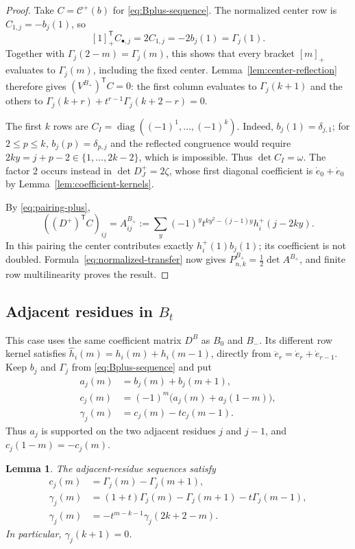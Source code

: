 \documentclass[12pt]{article}
\newtheorem{lemma}[theorem]{Lemma}
\numberwithin{equation}{section}
\newcommand{\dote}{\dot e}
\newcommand{\ddote}{\ddot e}
\newcommand{\diag}{\operatorname{diag}}
\begin{document}
\begin{proof}
Take $C=\mathcal C^+(b)$ for \eqref{eq:Bplus-sequence}.
The normalized center row is $C_{1,j}=-b_j(1)$, so
\[
 [1]_+^{\mathsf T}C_{\bullet,j}=2C_{1,j}
 =-2b_j(1)=\Gamma_j(1).
\]
Together with $\Gamma_j(2-m)=\Gamma_j(m)$, this shows that every
bracket $[m]_+$ evaluates to $\Gamma_j(m)$, including the fixed
center.  Lemma~\ref{lem:center-reflection} therefore gives
$(V^{B_+})^{\mathsf T}C=0$: the first column evaluates to
$\Gamma_j(k+1)$ and the others to
$\Gamma_j(k+r)+t^{r-1}\Gamma_j(k+2-r)=0$.

The first $k$ rows are
$C_I=\diag((-1)^1,\ldots,(-1)^k)$.
Indeed, $b_j(1)=\delta_{j,1}$; for $2\le p\le k$,
$b_j(p)=\delta_{p,j}$ and the reflected congruence would require
$2ky=j+p-2\in\{1,\ldots,2k-2\}$, which is impossible.
Thus $\det C_I=\omega$.  The factor $2$ occurs instead in
$\det D^+_J=2\zeta$, whose first diagonal coefficient is
$\dote_0+\dote_0$ by Lemma~\ref{lem:coefficient-kernels}.

By \eqref{eq:pairing-plus},
\[
 ((D^+)^{\mathsf T}C)_{ij}
 =A^{B_+}_{ij}:=\sum_y(-1)^yt^{ky^2-(j-1)y}h_i^+(j-2ky).
\]
In this pairing the center contributes exactly $h_i^+(1)b_j(1)$;
its coefficient is not doubled.  Formula~\eqref{eq:normalized-transfer}
now gives $P^{B_+}_{n,k}=\tfrac12\det A^{B_+}$, and finite row
multilinearity proves the result.
\end{proof}

\subsection{Adjacent residues in \texorpdfstring{$B_t$}{Bt}}

This case uses the same coefficient matrix $D^B$ as $B_0$ and $B_-$.
Its different row kernel satisfies
$\widehat h_i(m)=h_i(m)+h_i(m-1)$, directly from
$\ddote_r=\dote_r+\dote_{r-1}$.
Keep $b_j$ and $\Gamma_j$ from \eqref{eq:Bplus-sequence} and put
\[
\begin{aligned}
 a_j(m)&=b_j(m)+b_j(m+1),\\
 c_j(m)&=(-1)^m\bigl(a_j(m)+a_j(1-m)\bigr),\\
 \gamma_j(m)&=c_j(m)-tc_j(m-1).
\end{aligned}
\]
Thus $a_j$ is supported on the two adjacent residues $j$ and $j-1$,
and $c_j(1-m)=-c_j(m)$.

\begin{lemma}
The adjacent-residue sequences satisfy
\begin{align}
 c_j(m)&=\Gamma_j(m)-\Gamma_j(m+1),\label{eq:adjacent-difference}\\
 \gamma_j(m)&=(1+t)\Gamma_j(m)-\Gamma_j(m+1)-t\Gamma_j(m-1),
 \label{eq:adjacent-gamma}\\
 \gamma_j(m)&=-t^{m-k-1}\gamma_j(2k+2-m).
 \label{eq:adjacent-reflection}
\end{align}
In particular, $\gamma_j(k+1)=0$.
\end{lemma}
\end{document}
